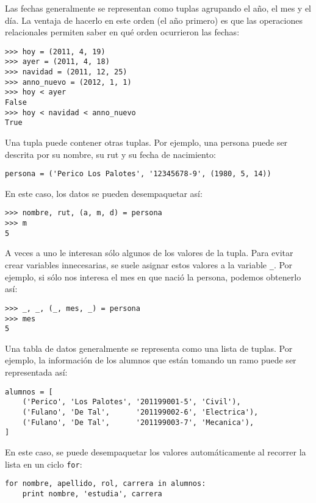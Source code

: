 Las fechas generalmente se representan como tuplas agrupando el año, el
mes y el día. La ventaja de hacerlo en este orden (el año primero) es
que las operaciones relacionales permiten saber en qué orden ocurrieron
las fechas:

\begin{lstlisting}
>>> hoy = (2011, 4, 19)
>>> ayer = (2011, 4, 18)
>>> navidad = (2011, 12, 25)
>>> anno_nuevo = (2012, 1, 1)
>>> hoy < ayer
False
>>> hoy < navidad < anno_nuevo
True
\end{lstlisting}

Una tupla puede contener otras tuplas. Por ejemplo, una persona puede
ser descrita por su nombre, su rut y su fecha de nacimiento:

\begin{lstlisting}
persona = ('Perico Los Palotes', '12345678-9', (1980, 5, 14))
\end{lstlisting}

En este caso, los datos se pueden desempaquetar así:

\begin{lstlisting}
>>> nombre, rut, (a, m, d) = persona
>>> m
5
\end{lstlisting}

A veces a uno le interesan sólo algunos de los valores de la tupla. Para
evitar crear variables innecesarias, se suele asignar estos valores a la
variable \lstinline!_!. Por ejemplo, si sólo nos interesa el mes en que
nació la persona, podemos obtenerlo así:

\begin{lstlisting}
>>> _, _, (_, mes, _) = persona
>>> mes
5
\end{lstlisting}

Una tabla de datos generalmente se representa como una lista de tuplas.
Por ejemplo, la información de los alumnos que están tomando un ramo
puede ser representada así:

\begin{lstlisting}
alumnos = [
    ('Perico', 'Los Palotes', '201199001-5', 'Civil'),
    ('Fulano', 'De Tal',      '201199002-6', 'Electrica'),
    ('Fulano', 'De Tal',      '201199003-7', 'Mecanica'),
]
\end{lstlisting}

En este caso, se puede desempaquetar los valores automáticamente al
recorrer la lista en un ciclo \lstinline!for!:

\begin{lstlisting}
for nombre, apellido, rol, carrera in alumnos:
    print nombre, 'estudia', carrera
\end{lstlisting}

